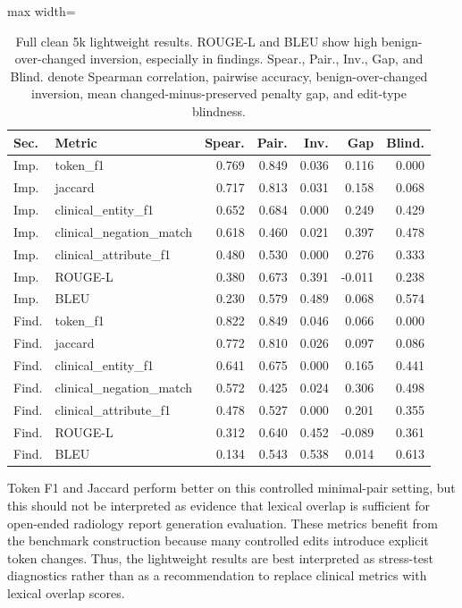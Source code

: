 \documentclass[11pt]{article}
\begin{document}
\begin{table}[H]
\centering
\scriptsize
\setlength{\tabcolsep}{2pt}
\begin{adjustbox}{max width=\columnwidth}
\begin{tabular}{llrrrrr}
\toprule
\textbf{Sec.} & \textbf{Metric} & \textbf{Spear.} & \textbf{Pair.} & \textbf{Inv.} & \textbf{Gap} & \textbf{Blind.} \\
\midrule
Imp. & token\_f1 & 0.769 & 0.849 & 0.036 & 0.116 & 0.000 \\
Imp. & jaccard & 0.717 & 0.813 & 0.031 & 0.158 & 0.068 \\
Imp. & clinical\_entity\_f1 & 0.652 & 0.684 & 0.000 & 0.249 & 0.429 \\
Imp. & clinical\_negation\_match & 0.618 & 0.460 & 0.021 & 0.397 & 0.478 \\
Imp. & clinical\_attribute\_f1 & 0.480 & 0.530 & 0.000 & 0.276 & 0.333 \\
Imp. & ROUGE-L & 0.380 & 0.673 & 0.391 & -0.011 & 0.238 \\
Imp. & BLEU & 0.230 & 0.579 & 0.489 & 0.068 & 0.574 \\
\midrule
Find. & token\_f1 & 0.822 & 0.849 & 0.046 & 0.066 & 0.000 \\
Find. & jaccard & 0.772 & 0.810 & 0.026 & 0.097 & 0.086 \\
Find. & clinical\_entity\_f1 & 0.641 & 0.675 & 0.000 & 0.165 & 0.441 \\
Find. & clinical\_negation\_match & 0.572 & 0.425 & 0.024 & 0.306 & 0.498 \\
Find. & clinical\_attribute\_f1 & 0.478 & 0.527 & 0.000 & 0.201 & 0.355 \\
Find. & ROUGE-L & 0.312 & 0.640 & 0.452 & -0.089 & 0.361 \\
Find. & BLEU & 0.134 & 0.543 & 0.538 & 0.014 & 0.613 \\
\bottomrule
\end{tabular}
\end{adjustbox}
\caption{Full clean 5k lightweight results. ROUGE-L and BLEU show high benign-over-changed inversion, especially in findings. Spear., Pair., Inv., Gap, and Blind. denote Spearman correlation, pairwise accuracy, benign-over-changed inversion, mean changed-minus-preserved penalty gap, and edit-type blindness.}
\label{tab:full-lightweight}
\end{table}

Token F1 and Jaccard perform better on this controlled minimal-pair setting, but this should not be interpreted as evidence that lexical overlap is sufficient for open-ended radiology report generation evaluation. 
These metrics benefit from the benchmark construction because many controlled edits introduce explicit token changes. 
Thus, the lightweight results are best interpreted as stress-test diagnostics rather than as a recommendation to replace clinical metrics with lexical overlap scores.
\end{document}

